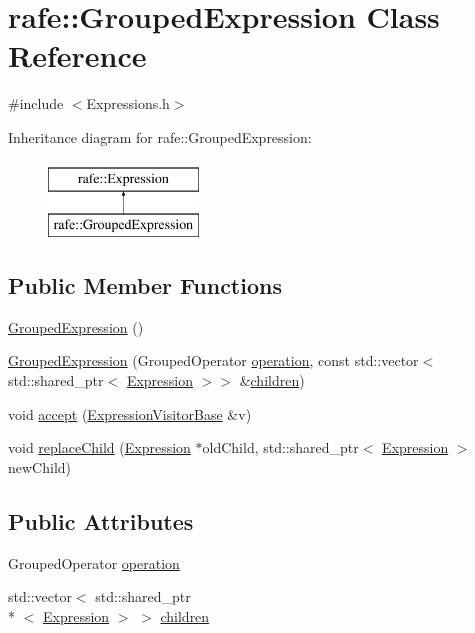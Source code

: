 \hypertarget{classrafe_1_1_grouped_expression}{\section{rafe\+:\+:Grouped\+Expression Class Reference}
\label{classrafe_1_1_grouped_expression}
}


{\ttfamily \#include $<$Expressions.\+h$>$}

Inheritance diagram for rafe\+:\+:Grouped\+Expression\+:\begin{figure}[H]
\begin{center}
\leavevmode
\includegraphics[height=2.000000cm]{classrafe_1_1_grouped_expression}
\end{center}
\end{figure}
\subsection*{Public Member Functions}
\begin{DoxyCompactItemize}
\item 
\hyperlink{classrafe_1_1_grouped_expression_a0f8325955c030168ab4590f631bcb0cf}{Grouped\+Expression} ()
\item 
\hyperlink{classrafe_1_1_grouped_expression_ab057facf61cab70b5a8e7aeb5438a55d}{Grouped\+Expression} (Grouped\+Operator \hyperlink{classrafe_1_1_grouped_expression_a269644ee2565184c9386dd57d24e93bb}{operation}, const std\+::vector$<$ std\+::shared\+\_\+ptr$<$ \hyperlink{classrafe_1_1_expression}{Expression} $>$$>$ \&\hyperlink{classrafe_1_1_grouped_expression_af31df501bd0d3e5ee9ce28ab4c71c4ee}{children})
\item 
void \hyperlink{classrafe_1_1_grouped_expression_a7f7e2cb9efd9457d80dc6365339957f6}{accept} (\hyperlink{classrafe_1_1_expression_visitor_base}{Expression\+Visitor\+Base} \&v)
\item 
void \hyperlink{classrafe_1_1_grouped_expression_ab770657757c0b374e4eacc8112ba9c4f}{replace\+Child} (\hyperlink{classrafe_1_1_expression}{Expression} $\ast$old\+Child, std\+::shared\+\_\+ptr$<$ \hyperlink{classrafe_1_1_expression}{Expression} $>$ new\+Child)
\end{DoxyCompactItemize}
\subsection*{Public Attributes}
\begin{DoxyCompactItemize}
\item 
Grouped\+Operator \hyperlink{classrafe_1_1_grouped_expression_a269644ee2565184c9386dd57d24e93bb}{operation}
\item 
std\+::vector$<$ std\+::shared\+\_\+ptr\\*
$<$ \hyperlink{classrafe_1_1_expression}{Expression} $>$ $>$ \hyperlink{classrafe_1_1_grouped_expression_af31df501bd0d3e5ee9ce28ab4c71c4ee}{children}
\end{DoxyCompactItemize}
